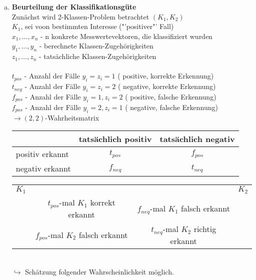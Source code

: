 \documentclass[a4paper,12pt]{scrreprt}
\newcommand{\Nb}[1]{\textbf{#1}}
\begin{document}
\begin{enumerate}[a)]
\item \Nb{Beurteilung der Klassifikationsgüte}\\
Zunächst wird 2-Klassen-Problem betrachtet $(K_1,K_2)$\\
$K_1$, sei voon bestimmten Interesse ("'positiver"' Fall)\\
$x_1,\dots,x_n$ - n konkrete Messwertevektoren, die klassifiziert wurden\\
$y_1,\dots,y_n$ - berechnete Klassen-Zugehörigkeiten\\
$z_1,\dots,z_n$ - tatsächliche Klassen-Zugehörigkeiten\\
\\
$t_{pos}$ - Anzahl der Fälle $y_i=z_i=1$ ( positive, korrekte Erkennung)\\
$t_{neg}$ - Anzahl der Fälle $y_i=z_i=2$ ( negative, korrekte Erkennung)\\
$f_{pos}$ - Anzahl der Fälle $y_i=1 , z_i=2$ ( positive, falsche Erkennung)\\
$f_{pos}$ - Anzahl der Fälle $y_i=2 , z_i=1$ ( negative, falsche Erkennung)\\
$\rightarrow (2,2)$-Wahrheitsmatrix\\
\begin{tabular}{l | c | c}
 & tatsächlich positiv & tatsächlich negativ\\
 \hline
 positiv erkannt & $t_{pos}$ & $f_{pos}$ \\
 negativ erkannt & $f_{neq}$ & $t_{neq}$ \\
\end{tabular}

\begin{tabular}{ | l c | c r | }
\hline
 $K_1$ & & & $K_2$\\
 & $t_{pos}$-mal $K_1$ korrekt erkannt & $f_{neq}$-mal $K_1$ falsch erkannt&\\
 & $f_{pos}$-mal $K_2$ falsch erkannt & $t_{neq}$-mal $K_2$ richtig erkannt&\\
\hline
 \end{tabular}\\
$\hookrightarrow$ Schätzung folgender Wahrscheinlichkeit möglich.\\


\end{enumerate}
\end{document}
